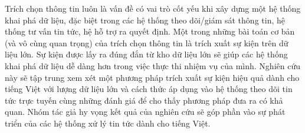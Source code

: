 


\begin{abstracts}        %
\noindent Trích chọn thông tin luôn là vấn đề có vai trò cốt yếu khi xây dựng một hệ thống khai phá dữ liệu, đặc biệt trong các hệ thống theo dõi/giám sát thông tin, hệ thống tư vấn tin tức, hệ hỗ trợ ra quyết định. Một trong những bài toán cơ bản (và vô cùng quan trọng) của trích chọn thông tin là trích xuất sự kiện trên dữ liệu lớn. Sự kiện được lấy ra đúng đắn từ kho dữ liệu lớn sẽ giúp các hệ thống khai phá dữ liệu dễ dàng hơn trong việc thực thi nhiệm vụ của mình. Nghiên cứu này sẽ tập trung xem xét một phương pháp trích xuất sự kiện hiệu quả dành cho tiếng Việt với lượng dữ liệu lớn và cách thức áp dụng vào hệ thống theo dõi tin tức trực tuyến cùng những đánh giá để cho thấy phương pháp đưa ra có khả quan. Nhóm tác giả hy vọng kết quả của nghiên cứu sẽ góp phần vào sự phát triển của các hệ thống xử lý tin tức dành cho tiếng Việt.





\end{abstracts}



